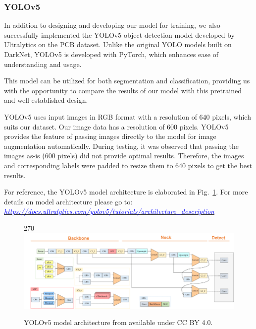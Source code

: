 \documentclass[12pt]{article}
\begin{document}
\clearpage
\newpage


\subsubsection{YOLOv5}
In addition to designing and developing our model for training, we also successfully implemented the YOLOv5 object detection model developed by Ultralytics on the PCB dataset. Unlike the original YOLO models built on DarkNet, YOLOv5 is developed with PyTorch, which enhances ease of understanding and usage.

This model can be utilized for both segmentation and classification, providing us with the opportunity to compare the results of our model with this pretrained and well-established design.

YOLOv5 uses input images in RGB format with a resolution of 640 pixels, which suits our dataset. Our image data has a resolution of 600 pixels. YOLOv5 provides the feature of passing images directly to the model for image augmentation automatically. During testing, it was observed that passing the images as-is (600 pixels) did not provide optimal results. Therefore, the images and corresponding labels were padded to resize them to 640 pixels to get the best results.

For reference, the YOLOv5 model architecture is elaborated in Fig.~\ref{fig:yolov5model}. For more details on model architecture please go to:\\

\href{https://docs.ultralytics.com/yolov5/tutorials/architecture_description}{\textit{\textcolor{blue}{https://docs.ultralytics.com/yolov5/tutorials/architecture\_description}}}

\begin{figure}[p]
    \centering
    \begin{turn}{270}
    \includegraphics[width=1\paperwidth,height=1\paperheight,keepaspectratio]{./graphics/YOLOv5-architecture.png}
    \end{turn}
    \caption{YOLOv5 model architecture from \cite{Kim2021} available under CC BY 4.0.}
    \label{fig:yolov5model}
\end{figure}
\restoregeometry
\end{document}
